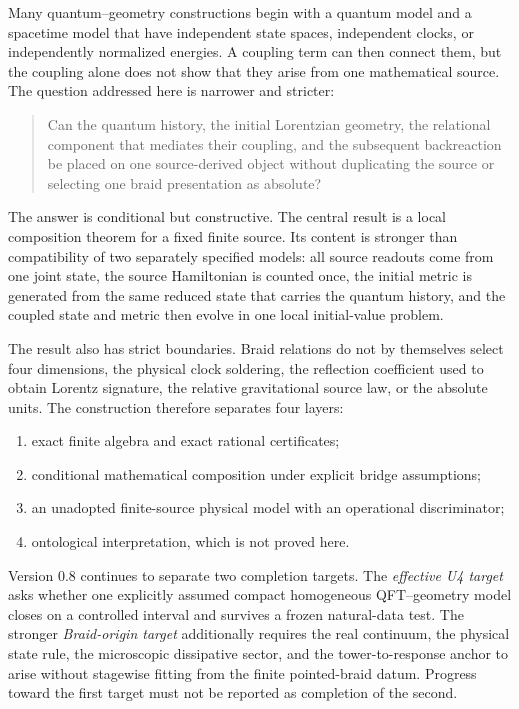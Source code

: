 \documentclass[11pt]{article}
\theoremstyle{definition}
\theoremstyle{remark}
\begin{document}
Many quantum--geometry constructions begin with a quantum model and a spacetime model that have independent state spaces, independent clocks, or independently normalized energies. A coupling term can then connect them, but the coupling alone does not show that they arise from one mathematical source. The question addressed here is narrower and stricter:

\begin{quote}
Can the quantum history, the initial Lorentzian geometry, the relational component that mediates their coupling, and the subsequent backreaction be placed on one source-derived object without duplicating the source or selecting one braid presentation as absolute?
\end{quote}

The answer is conditional but constructive. The central result is a local composition theorem for a fixed finite source. Its content is stronger than compatibility of two separately specified models: all source readouts come from one joint state, the source Hamiltonian is counted once, the initial metric is generated from the same reduced state that carries the quantum history, and the coupled state and metric then evolve in one local initial-value problem.

The result also has strict boundaries. Braid relations do not by themselves select four dimensions, the physical clock soldering, the reflection coefficient used to obtain Lorentz signature, the relative gravitational source law, or the absolute units. The construction therefore separates four layers:

\begin{enumerate}
\item exact finite algebra and exact rational certificates;
\item conditional mathematical composition under explicit bridge assumptions;
\item an unadopted finite-source physical model with an operational discriminator;
\item ontological interpretation, which is not proved here.
\end{enumerate}

Version 0.8 continues to separate two completion targets. The \emph{effective U4 target} asks whether one explicitly assumed compact homogeneous QFT--geometry model closes on a controlled interval and survives a frozen natural-data test. The stronger \emph{Braid-origin target} additionally requires the real continuum, the physical state rule, the microscopic dissipative sector, and the tower-to-response anchor to arise without stagewise fitting from the finite pointed-braid datum. Progress toward the first target must not be reported as completion of the second.
\end{document}
